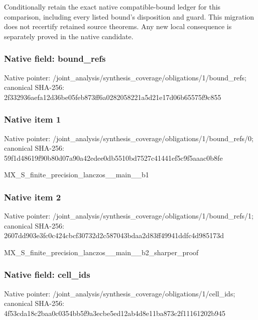 \documentclass[10pt,a4paper]{article}
\begin{document}
\begingroup\raggedright\sloppy Conditionally retain the exact native compatible-bound ledger for this comparison,\allowbreak{} including every listed bound's disposition and guard. This migration does not recertify retained source theorems. Any new local consequence is separately proved in the native candidate.\par\endgroup

\subsubsection{Native field: bound\_\allowbreak{}refs}
Native pointer: /joint\_\allowbreak{}analysis/synthesis\_\allowbreak{}coverage/obligations/1/bound\_\allowbreak{}refs; canonical SHA-256: 2f332936aefa12d36be05feb873ff6a0282058221a5d21e17d06b65575f9c855

\subsubsection{Native item 1}
Native pointer: /joint\_\allowbreak{}analysis/synthesis\_\allowbreak{}coverage/obligations/1/bound\_\allowbreak{}refs/0; canonical SHA-256: 59f1d48619f90b80d07a90a42edee0db5510bd7527c41441ef5c9f5aaac0b8fe

\begingroup\raggedright\sloppy MX\_\allowbreak{}S\_\allowbreak{}finite\_\allowbreak{}precision\_\allowbreak{}lanczos\_\allowbreak{}\_\allowbreak{}main\_\allowbreak{}\_\allowbreak{}b1\par\endgroup

\subsubsection{Native item 2}
Native pointer: /joint\_\allowbreak{}analysis/synthesis\_\allowbreak{}coverage/obligations/1/bound\_\allowbreak{}refs/1; canonical SHA-256: 2607dd903e3fc0c424cbcf30732d2c587043bdaa2d83ff49941ddfc4d985173d

\begingroup\raggedright\sloppy MX\_\allowbreak{}S\_\allowbreak{}finite\_\allowbreak{}precision\_\allowbreak{}lanczos\_\allowbreak{}\_\allowbreak{}main\_\allowbreak{}\_\allowbreak{}b2\_\allowbreak{}sharper\_\allowbreak{}proof\par\endgroup

\subsubsection{Native field: cell\_\allowbreak{}ids}
Native pointer: /joint\_\allowbreak{}analysis/synthesis\_\allowbreak{}coverage/obligations/1/cell\_\allowbreak{}ids; canonical SHA-256: 4f53cda18c2baa0c0354bb5f9a3ecbe5ed12ab4d8e11ba873c2f11161202b945
\end{document}

